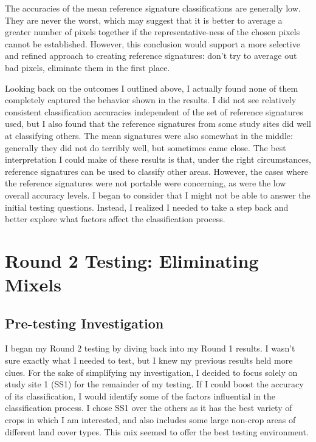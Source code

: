 The accuracies of the mean reference signature classifications are generally low. They are never the worst, which may suggest that it is better to average a greater number of pixels together if the representative-ness of the chosen pixels cannot be established. However, this conclusion would support a more selective and refined approach to creating reference signatures: don’t try to average out bad pixels, eliminate them in the first place.

Looking back on the outcomes I outlined above, I actually found none of them completely captured the behavior shown in the results. I did not see relatively consistent classification accuracies independent of the set of reference signatures used, but I also found that the reference signatures from some study sites did well at classifying others. The mean signatures were also somewhat in the middle: generally they did not do terribly well, but sometimes came close. The best interpretation I could make of these results is that, under the right circumstances, reference signatures can be used to classify other areas. However, the cases where the reference signatures were not portable were concerning, as were the low overall accuracy levels. I began to consider that I might not be able to answer the initial testing questions. Instead, I realized I needed to take a step back and better explore what factors affect the classification process.


\section{Round 2 Testing: Eliminating Mixels}
\label{appendix:testing:r2}

\subsection*{Pre-testing Investigation}

I began my Round 2 testing by diving back into my Round 1 results. I wasn’t sure exactly what I needed to test, but I knew my previous results held more clues. For the sake of simplifying my investigation, I decided to focus solely on study site 1 (SS1) for the remainder of my testing. If I could boost the accuracy of its classification, I would identify some of the factors influential in the classification process. I chose SS1 over the others as it has the best variety of crops in which I am interested, and also includes some large non-crop areas of different land cover types. This mix seemed to offer the best testing environment.

